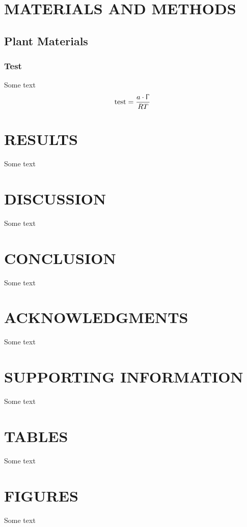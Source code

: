 \documentclass[letterpaper,12pt]{article}
\begin{document}
\section{MATERIALS AND METHODS}
\subsection{Plant Materials}
\subsubsection{Test}
\par Some text
\begin{equation}
	\text{test} = \dfrac{a \cdot \Upgamma}{RT}
\end{equation}




\section{RESULTS}
\par Some text




\section{DISCUSSION}
\par Some text




\section{CONCLUSION}
\par Some text




\section*{ACKNOWLEDGMENTS}
\par Some text




\section*{SUPPORTING INFORMATION}
\par Some text




\clearpage
\section*{TABLES}
\par Some text




\begin{singlespace}


\end{singlespace}




\clearpage
\section*{FIGURES}
\par Some text
\end{document}
